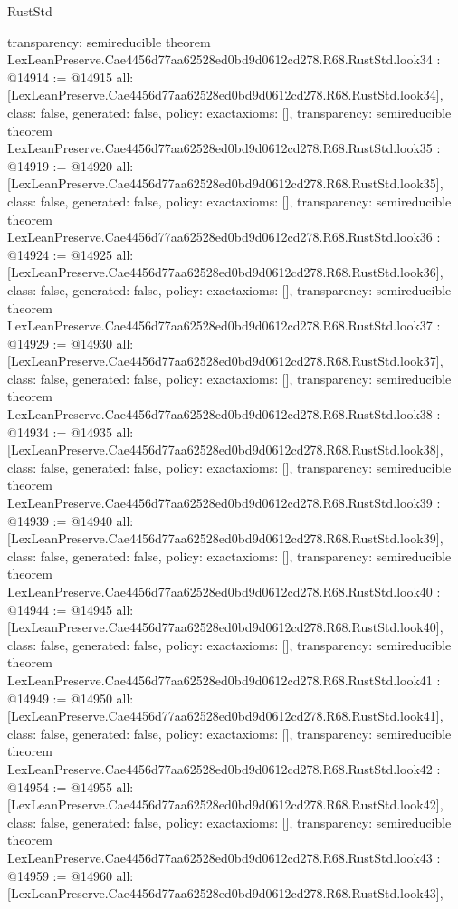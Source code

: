 \begin{lexlean}{RustStd}
\begin{coremodule}
{  transparency: semireducible
}
theorem LexLeanPreserve.Cae4456d77aa62528ed0bd9d0612cd278.R68.RustStd.look34 : @14914 := @14915 {
  all: [LexLeanPreserve.Cae4456d77aa62528ed0bd9d0612cd278.R68.RustStd.look34],
  class: false,
  generated: false,
  policy: exact{axioms: []},
  transparency: semireducible
}
theorem LexLeanPreserve.Cae4456d77aa62528ed0bd9d0612cd278.R68.RustStd.look35 : @14919 := @14920 {
  all: [LexLeanPreserve.Cae4456d77aa62528ed0bd9d0612cd278.R68.RustStd.look35],
  class: false,
  generated: false,
  policy: exact{axioms: []},
  transparency: semireducible
}
theorem LexLeanPreserve.Cae4456d77aa62528ed0bd9d0612cd278.R68.RustStd.look36 : @14924 := @14925 {
  all: [LexLeanPreserve.Cae4456d77aa62528ed0bd9d0612cd278.R68.RustStd.look36],
  class: false,
  generated: false,
  policy: exact{axioms: []},
  transparency: semireducible
}
theorem LexLeanPreserve.Cae4456d77aa62528ed0bd9d0612cd278.R68.RustStd.look37 : @14929 := @14930 {
  all: [LexLeanPreserve.Cae4456d77aa62528ed0bd9d0612cd278.R68.RustStd.look37],
  class: false,
  generated: false,
  policy: exact{axioms: []},
  transparency: semireducible
}
theorem LexLeanPreserve.Cae4456d77aa62528ed0bd9d0612cd278.R68.RustStd.look38 : @14934 := @14935 {
  all: [LexLeanPreserve.Cae4456d77aa62528ed0bd9d0612cd278.R68.RustStd.look38],
  class: false,
  generated: false,
  policy: exact{axioms: []},
  transparency: semireducible
}
theorem LexLeanPreserve.Cae4456d77aa62528ed0bd9d0612cd278.R68.RustStd.look39 : @14939 := @14940 {
  all: [LexLeanPreserve.Cae4456d77aa62528ed0bd9d0612cd278.R68.RustStd.look39],
  class: false,
  generated: false,
  policy: exact{axioms: []},
  transparency: semireducible
}
theorem LexLeanPreserve.Cae4456d77aa62528ed0bd9d0612cd278.R68.RustStd.look40 : @14944 := @14945 {
  all: [LexLeanPreserve.Cae4456d77aa62528ed0bd9d0612cd278.R68.RustStd.look40],
  class: false,
  generated: false,
  policy: exact{axioms: []},
  transparency: semireducible
}
theorem LexLeanPreserve.Cae4456d77aa62528ed0bd9d0612cd278.R68.RustStd.look41 : @14949 := @14950 {
  all: [LexLeanPreserve.Cae4456d77aa62528ed0bd9d0612cd278.R68.RustStd.look41],
  class: false,
  generated: false,
  policy: exact{axioms: []},
  transparency: semireducible
}
theorem LexLeanPreserve.Cae4456d77aa62528ed0bd9d0612cd278.R68.RustStd.look42 : @14954 := @14955 {
  all: [LexLeanPreserve.Cae4456d77aa62528ed0bd9d0612cd278.R68.RustStd.look42],
  class: false,
  generated: false,
  policy: exact{axioms: []},
  transparency: semireducible
}
theorem LexLeanPreserve.Cae4456d77aa62528ed0bd9d0612cd278.R68.RustStd.look43 : @14959 := @14960 {
  all: [LexLeanPreserve.Cae4456d77aa62528ed0bd9d0612cd278.R68.RustStd.look43],
}
\end{coremodule}
\end{lexlean}

